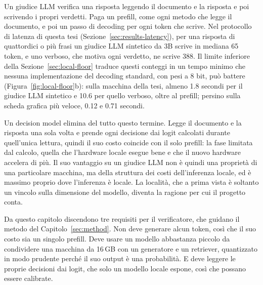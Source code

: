 Un giudice LLM verifica una risposta leggendo il documento e la risposta e poi scrivendo i propri verdetti. Paga
un prefill, come ogni metodo che legge il documento, e poi un passo di decoding per ogni token che scrive. Nel protocollo
di latenza di questa tesi (Sezione~\ref{sec:results-latency}), per una risposta di quattordici o più frasi un giudice LLM
sintetico da 3B scrive in mediana 65 token, e uno verboso, che motiva ogni verdetto, ne scrive 388. Il limite inferiore
della Sezione~\ref{sec:local-floor} traduce questi conteggi in un tempo minimo che nessuna implementazione del decoding standard, con pesi a 8 bit, può battere
(Figura~\ref{fig:local-floor}b): sulla macchina della tesi, almeno 1.8 secondi per il giudice LLM sintetico e 10.6 per quello
verboso, oltre al prefill; persino sulla scheda grafica più veloce, 0.12 e 0.71 secondi.

Un decision model elimina del tutto questo termine. Legge il documento e la risposta una sola volta e prende ogni decisione
dai logit calcolati durante quell'unica lettura, quindi il suo costo coincide con il solo prefill: la fase limitata dal
calcolo, quella che l'hardware locale esegue bene e che il nuovo hardware accelera di più. Il suo vantaggio su un giudice LLM
non è quindi una proprietà di una particolare macchina, ma della struttura dei costi dell'inferenza locale, ed è massimo
proprio dove l'inferenza è locale. La località, che a prima vista è soltanto un vincolo sulla dimensione del modello,
diventa la ragione per cui il progetto conta.

Da questo capitolo discendono tre requisiti per il verificatore, che guidano il metodo del Capitolo~\ref{sec:method}.
Non deve generare alcun token, così che il suo costo sia un singolo prefill. Deve usare un modello abbastanza piccolo da
condividere una macchina da 16\,GB con un generatore e un retriever, quantizzato in modo prudente perché il suo output è
una probabilità. E deve leggere le proprie decisioni dai logit, che solo un modello locale espone, così che possano essere
calibrate.

